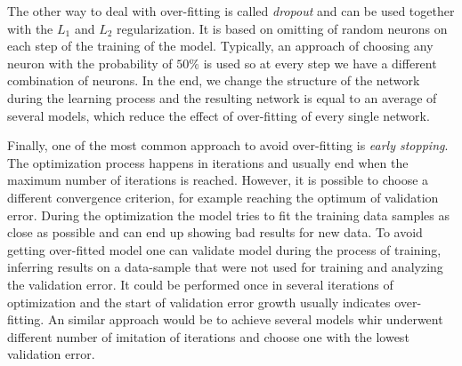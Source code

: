 The other way to deal with over-fitting is called \emph{dropout} and can be used together with the $L_{1}$ and $L_{2}$ regularization.
It is based on omitting of random neurons on each step of the training of the model.
Typically, an approach of choosing any neuron with the probability of $50\%$ is used so at every step we have a different combination of neurons.
In the end, we change the structure of the network during the learning process and the resulting network is equal to an average of several models, which reduce the effect of over-fitting of every single network.

Finally, one of the most common approach to avoid over-fitting is \emph{early stopping}.
The optimization process happens in iterations and usually end when the maximum number of iterations is reached.
However, it is possible to choose a different convergence criterion, for example reaching the optimum of validation error.
During the optimization the model tries to fit the training data samples as close as possible and can end up showing bad results for new data.
To avoid getting over-fitted model one can validate model during the process of training, inferring results on a data-sample that were not used for training and analyzing the validation error.
It could be performed once in several iterations of optimization and the start of validation error growth usually indicates over-fitting.
An similar approach would be to achieve several models  whir underwent different number of imitation of iterations and choose one with the lowest validation error.



